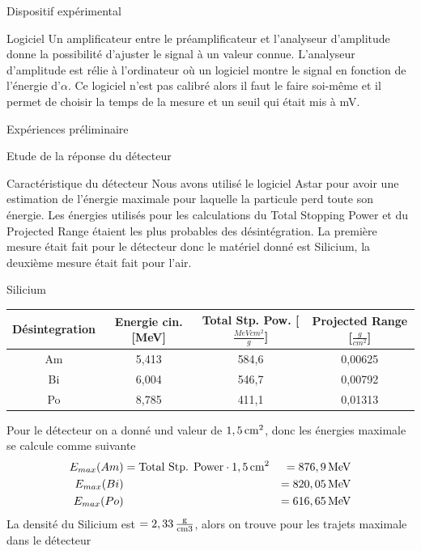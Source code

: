 \documentclass[a4paper,11pt,liststotocnumbered,bibtotocnumbered]{scrartcl}
\begin{document}
\begin{section}{Dispositif expérimental}
  \begin{subsection}{Logiciel}
   Un amplificateur entre le préamplificateur et l'analyseur d'amplitude donne la possibilité d'ajuster le signal à un valeur connue. L'analyseur d'amplitude est rélie à l'ordinateur où un logiciel montre le signal en fonction de l'énergie d'$\alpha$. Ce logiciel n'est pas calibré alors il faut le faire soi-même et il permet de choisir la temps de la mesure et un seuil qui était mis à \unit[200]{mV}.
  \end{subsection}
 \end{section}
  
 \begin{section}{Expériences préliminaire}
  \begin{subsection}{Etude de la réponse du détecteur}
   \begin{subsubsection}{Caractéristique du détecteur}
   Nous avons utilisé le logiciel \flqq Astar \frqq \cite{astar} pour avoir une estimation de l'énergie maximale pour laquelle la particule perd toute son énergie.  Les énergies utilisés pour les calculations du Total Stopping Power et du Projected Range étaient les plus probables des désintégration. La première mesure était fait pour le détecteur donc le matériel donné est Silicium, la deuxième mesure était fait pour l'air.
   \begin{paragraph}{Silicium}
    \begin{center}
     \begin{tabular}{c|c|c|c}
      Désintegration&	Energie cin. [MeV] & Total Stp. Pow. [$\frac{MeV cm^2}{g}$]  & Projected Range [$\frac{g}{cm^2}$] \\ \hline
      Am 	&5,413 & 584,6 & 0,00625 \\ 
      Bi	&6,004 & 546,7 & 0,00792 \\ 
      Po	&8,785 & 411,1 & 0,01313 \\ 
     \end{tabular}
    \end{center}
    Pour le détecteur on a donné und valeur de $\unit[1,5]{cm^2}$, donc les énergies maximale se calcule comme suivante 
    \begin{eqnarray*}
     E_{max}(Am)&=\text{Total Stp. Power}\cdot \unit[1,5]{cm^2}&=\unit[876,9]{MeV}\\
     E_{max}(Bi)&&=\unit[820,05]{MeV}\\
     E_{max}(Po)&&=\unit[616,65]{MeV}
    \end{eqnarray*}
    La densité du Silicium \cite{wikisi} est $\rho=\unit[2,33]{\frac{g}{cm3}}$, alors on trouve pour les trajets maximale dans le détecteur

\end{paragraph}
\end{subsubsection}
\end{subsection}
\end{section}
\end{document}
